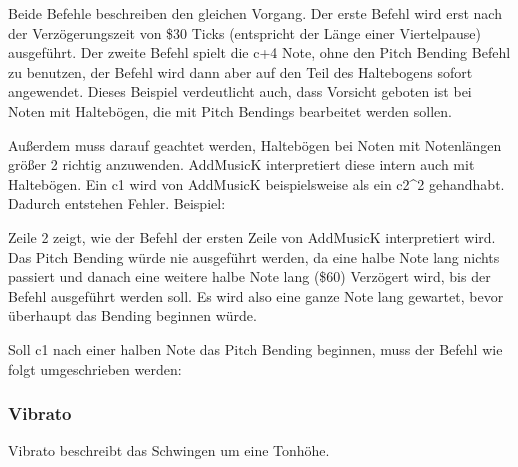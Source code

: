 \medskip



\medskip

Beide Befehle beschreiben den gleichen Vorgang. Der erste Befehl wird erst nach der Verzögerungszeit von \$30 Ticks (entspricht der Länge einer Viertelpause) ausgeführt. Der zweite Befehl spielt die c+4 Note, ohne den Pitch Bending Befehl zu benutzen, der Befehl wird dann aber auf den Teil des Haltebogens sofort angewendet. Dieses Beispiel verdeutlicht auch, dass Vorsicht geboten ist bei Noten mit Haltebögen, die mit Pitch Bendings bearbeitet werden sollen.

\bigskip

Außerdem muss darauf geachtet werden, Haltebögen bei Noten mit Notenlängen größer 2 richtig anzuwenden. AddMusicK interpretiert diese intern auch mit Haltebögen. Ein c1 wird von AddMusicK beispielsweise als ein c2\textasciicircum2 gehandhabt. Dadurch entstehen Fehler. Beispiel:

\medskip



\medskip

Zeile 2 zeigt, wie der Befehl der ersten Zeile von AddMusicK interpretiert wird. Das Pitch Bending würde nie ausgeführt werden, da eine halbe Note lang nichts passiert und danach eine weitere halbe Note lang (\$60) Verzögert wird, bis der Befehl ausgeführt werden soll. Es wird also eine ganze Note lang gewartet, bevor überhaupt das Bending beginnen würde.

Soll c1 nach einer halben Note das Pitch Bending beginnen, muss der Befehl wie folgt umgeschrieben werden:

\medskip



\medskip



\subsubsection{Vibrato}

Vibrato beschreibt das Schwingen um eine Tonhöhe.

